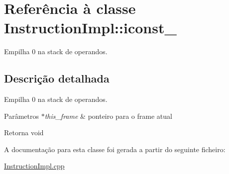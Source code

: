 \hypertarget{class_instruction_impl_1_1iconst__0}{}\section{Referência à classe Instruction\+Impl\+:\+:iconst\+\_}
\label{class_instruction_impl_1_1iconst__0}


Empilha 0 na stack de operandos.  




\subsection{Descrição detalhada}
Empilha 0 na stack de operandos. 


\begin{DoxyParams}{Parâmetros}
{\em $\ast$this\+\_\+frame} & ponteiro para o frame atual \\
\hline
\end{DoxyParams}
\begin{DoxyReturn}{Retorna}
void 
\end{DoxyReturn}


A documentação para esta classe foi gerada a partir do seguinte ficheiro\+:\begin{DoxyCompactItemize}
\item 
\hyperlink{_instruction_impl_8cpp}{Instruction\+Impl.\+cpp}\end{DoxyCompactItemize}
